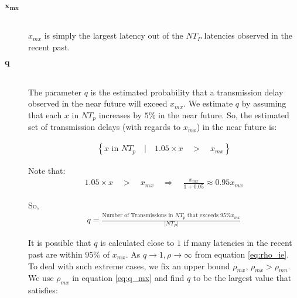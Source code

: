         \begin{description}
        \item[\Huge$\boldsymbol{x_{mx}}$] \hfill \\
        $x_{mx}$ is simply the largest latency out of the $NT_P$ latencies observed in the recent past.  

        \item[\Huge$\boldsymbol{q}$] \hfill \\
                The parameter $q$ is the estimated probability that a transmission delay observed in the near future will exceed $x_{mx}$.  We estimate $q$ by assuming that each $x$ in $NT_p$ increases by $5\%$ in the near future.  So, the estimated set of transmission delays (with regards to $x_{mx}$) in the near future is:
                
        \begin{equation}
            \begin{aligned}
                \left\{ x \text{ in } NT_p \quad  | \quad 1.05 \times x \quad > \quad x_{mx} \right\}
            \end{aligned}
        \end{equation}
                
        Note that:
         \begin{equation}
            \begin{aligned}
                1.05 \times x \quad > \quad x_{mx} \quad \Rightarrow \quad \frac{x_{mx}}{1 + 0.05 } \approx 0.95 x_{mx}
            \end{aligned}
        \end{equation}
                
        So,
            \begin{equation}
            \begin{aligned}
                q  = \frac{\text{Number of Transmissions in } NT_p \text{ that exceeds } 95\% x_{mx}}{|NT_P|}
            \end{aligned}
        \end{equation}
        
                It is possible that $q$ is calculated close to $1$ if many latencies in the recent past are within $95\%$ of $x_{mx}$.  As $q \rightarrow 1, \rho \rightarrow \infty$ from equation \ref{eq:rho_ie}.  To deal with such extreme cases, we fix an upper bound $\rho_{mx}$, $\rho_{mx} > \rho_{mn}$.  We use $\rho_{mx}$ in equation \ref{eq:q_mx} and find $q$ to be the largest value that satisfies:
                

\end{description}
